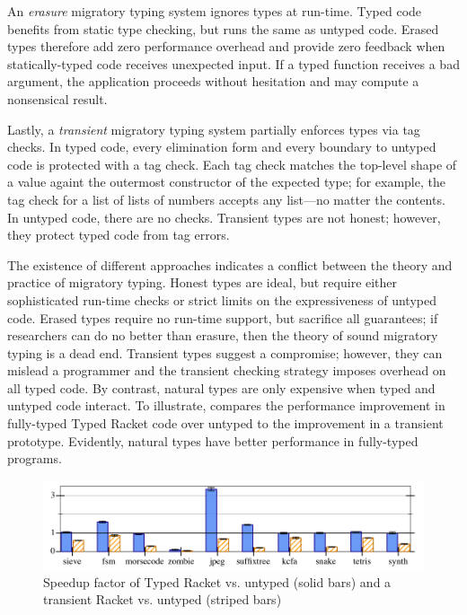An \emph{erasure}\/ migratory typing system ignores types at run-time.
Typed code benefits from static type checking, but runs the same as untyped code.
Erased types therefore add zero performance overhead and provide zero feedback
 when statically-typed code receives unexpected input.
If a typed function receives a bad argument, the application proceeds without
 hesitation and may compute a nonsensical result.

Lastly, a \emph{transient}\/ migratory typing system partially enforces types
 via tag checks.
In typed code, every elimination form and every boundary to untyped code
 is protected with a tag check.
Each tag check matches the top-level shape of a value againt the outermost
 constructor of the expected type; for example, the tag check for a
 list of lists of numbers accepts any list---no matter the contents.
In untyped code, there are no checks.
Transient types are not honest; however, they protect typed code from tag
 errors.

The existence of different approaches indicates a conflict between the theory
 and practice of migratory typing.
Honest types are ideal, but require either sophisticated run-time checks
 or strict limits on the expressiveness of untyped code.
Erased types require no run-time support, but sacrifice all
 guarantees;
 if researchers can do no better than erasure, then the theory of
 sound migratory typing is a dead end.
Transient types suggest a compromise; however, they can mislead a programmer
 and the transient checking strategy imposes overhead on all typed code.
By contrast, natural types are only expensive when typed and untyped code interact.
To illustrate,  compares the performance improvement
 in fully-typed Typed Racket code over untyped to the improvement in a
 transient prototype.
Evidently, natural types have better performance in fully-typed programs.

\begin{figure}[h]
  \includegraphics[width=0.8\columnwidth]{src/icfp-bars.png}
  \caption{Speedup factor of Typed Racket vs. untyped (solid bars) and a transient Racket vs. untyped (striped bars)~\cite{gf-icfp-2018}}
  \label{fig:icfp-bars}
\end{figure}


